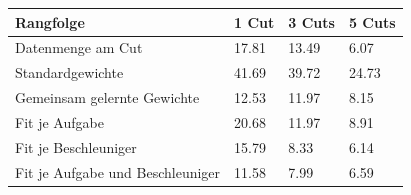 \begin{tabular}{@{}llll@{}}
\toprule
Rangfolge & 1 Cut & 3 Cuts & 5 Cuts \\
\midrule
Datenmenge am Cut & 17.81 & 13.49 & 6.07 \\
Standardgewichte & 41.69 & 39.72 & 24.73 \\
Gemeinsam gelernte Gewichte & 12.53 & 11.97 & 8.15 \\
Fit je Aufgabe & 20.68 & 11.97 & 8.91 \\
Fit je Beschleuniger & 15.79 & 8.33 & 6.14 \\
Fit je Aufgabe und Beschleuniger & 11.58 & 7.99 & 6.59 \\
\bottomrule
\end{tabular}
